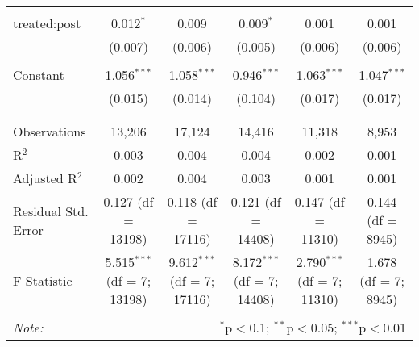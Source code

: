 \begin{table}[!htbp]
\begin{adjustbox}{width=\textwidth}
\begin{tabular}{@{\extracolsep{5pt}}lccccc}
  & & & & & \\ 
 treated:post & 0.012$^{*}$ & 0.009 & 0.009$^{*}$ & 0.001 & 0.001 \\ 
  & (0.007) & (0.006) & (0.005) & (0.006) & (0.006) \\ 
  & & & & & \\ 
 Constant & 1.056$^{***}$ & 1.058$^{***}$ & 0.946$^{***}$ & 1.063$^{***}$ & 1.047$^{***}$ \\ 
  & (0.015) & (0.014) & (0.104) & (0.017) & (0.017) \\ 
  & & & & & \\ 
\hline \\[-1.8ex] 
Observations & 13,206 & 17,124 & 14,416 & 11,318 & 8,953 \\ 
R$^{2}$ & 0.003 & 0.004 & 0.004 & 0.002 & 0.001 \\ 
Adjusted R$^{2}$ & 0.002 & 0.004 & 0.003 & 0.001 & 0.001 \\ 
Residual Std. Error & 0.127 (df = 13198) & 0.118 (df = 17116) & 0.121 (df = 14408) & 0.147 (df = 11310) & 0.144 (df = 8945) \\ 
F Statistic & 5.515$^{***}$ (df = 7; 13198) & 9.612$^{***}$ (df = 7; 17116) & 8.172$^{***}$ (df = 7; 14408) & 2.790$^{***}$ (df = 7; 11310) & 1.678 (df = 7; 8945) \\ 
\hline 
\hline \\[-1.8ex] 
\textit{Note:}  & \multicolumn{5}{r}{$^{*}$p$<$0.1; $^{**}$p$<$0.05; $^{***}$p$<$0.01} \\ 
\end{tabular}
\end{adjustbox}
\end{table} 
